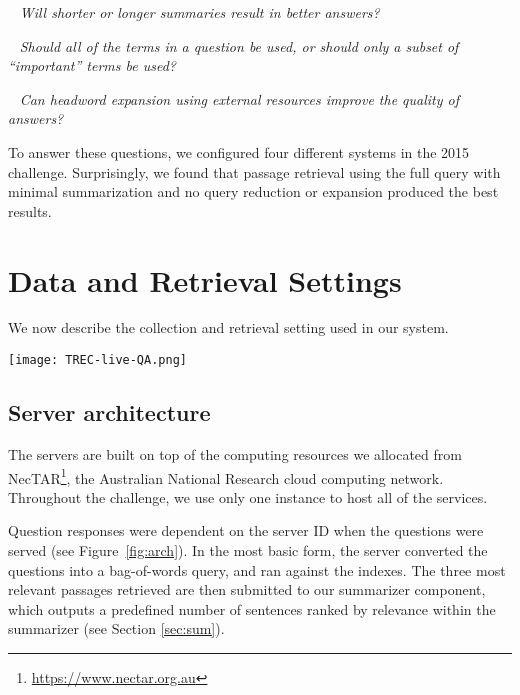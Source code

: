 \documentclass[a4paper,10pt,conference,compsocconf,final]{IEEEtran}
\newcommand{\myparagraph}[1]{\vspace*{1ex}\noindent{\textbf{#1.}}~}
\newcommand{\ko}[1]{\textrm{\textcolor{red}{Kevin says: #1\\}}}
\begin{document}
\myparagraph{RQ 1:}
{\emph{
Will shorter or longer summaries result in better answers?
}}

\myparagraph{RQ 2:}
{\emph{
Should all of the terms in a question be used, or should only a 
subset of ``important'' terms be used?
}}

\myparagraph{RQ 3:}
{\emph{
Can headword expansion using external resources improve the
quality of answers?
}}

\bigskip

To answer these questions, we configured four different systems 
in the 2015 challenge.
Surprisingly, we found that passage retrieval using the full query
with minimal summarization and no query reduction or expansion
produced the best results.

\section{Data and Retrieval Settings}
We now describe the collection and retrieval setting used in our
system. 

\begin{figure*}
  \centering
  \texttt{[image: TREC-live-QA.png]}
  \label{fig:arch}
  \caption{System architecture for each RMIT system.
  Green shading indicates components that are different when compared
  to RMIT-0.}
  \end{figure*}

\subsection{Server architecture}

The servers are built on top of the computing resources we allocated
from NecTAR\footnote{\url{https://www.nectar.org.au}}, the Australian
National Research cloud computing network.
Throughout the challenge, we use only one instance to host all of the
services.

Question responses were dependent on the server ID when the questions
were served (see Figure~\ref{fig:arch}).
In the most basic form, the server converted the questions into a bag-of-words
query, and ran against the indexes.
The three most relevant passages retrieved are then submitted to our 
summarizer component, which outputs a predefined number of sentences ranked by
relevance within the summarizer (see Section \ref{sec:sum}).
\end{document}
